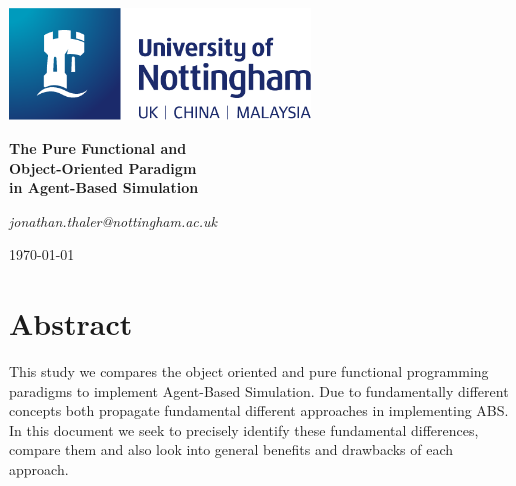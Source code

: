 \documentclass[oneside]{book}
\begin{document}
\begin{titlepage}
	\centering
	\includegraphics[width=0.60\textwidth]{../../logo/UoN_Primary_Logo_RGB.png}\par\vspace{1cm}
	\vspace{1.5cm}
	{\huge\bfseries The Pure Functional and \\ Object-Oriented Paradigm \\ in Agent-Based Simulation \par}
	\vspace{2cm}
	{\Large\itshape jonathan.thaler@nottingham.ac.uk \par}
	\vfill
	
	\vfill

	{\large \today\par}
\end{titlepage}

\cleardoublepage

\section*{Abstract}
This study we compares the object oriented and pure functional programming paradigms to implement Agent-Based Simulation. Due to fundamentally different concepts both propagate fundamental different approaches in implementing ABS. In this document we seek to precisely identify these fundamental differences, compare them and also look into general benefits and drawbacks of each approach.

\clearpage
\tableofcontents
\clearpage





















\renewcommand\bibname{References}



\end{document}
